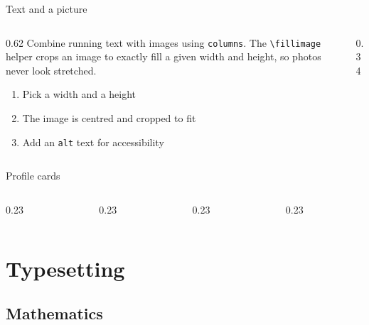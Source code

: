 \documentclass[aspectratio=169,onlytextwidth]{beamer}
\begin{document}
\begin{frame}{Text and a picture}
  \begin{columns}
    \begin{column}{0.62\textwidth}
      Combine running text with images using \texttt{columns}. The
      \texttt{\textbackslash fillimage} helper crops an image to exactly fill a
      given width and height, so photos never look stretched.

      \begin{enumerate}
        \item Pick a width and a height
        \item The image is centred and cropped to fit
        \item Add an \texttt{alt} text for accessibility
      \end{enumerate}
    \end{column}
    \begin{column}{0.34\textwidth}
    \end{column}
  \end{columns}
\end{frame}

\begin{frame}{Profile cards}
  \begin{columns}
    \begin{column}[T]{0.23\textwidth}
    \end{column}
    \begin{column}[T]{0.23\textwidth}
    \end{column}
    \begin{column}[T]{0.23\textwidth}
    \end{column}
    \begin{column}[T]{0.23\textwidth}
    \end{column}
  \end{columns}
\end{frame}


\section{Typesetting}

\subsection{Mathematics}
\end{document}
